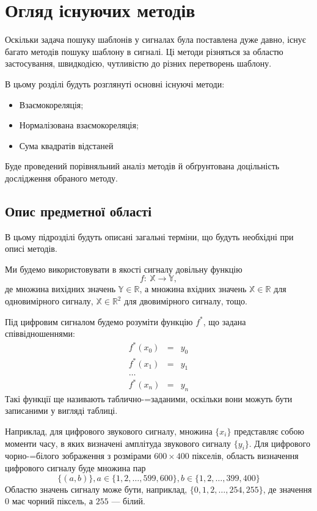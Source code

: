 \chapter{Огляд існуючих методів}

Оскільки задача пошуку шаблонів у сигналах була поставлена дуже давно, існує багато методів пошуку шаблону в сигналі.
Ці методи різняться за областю застосування, швидкодією, чутливістю до різних перетворень шаблону.

В цьому розділі будуть розглянуті основні існуючі методи:
\begin{itemize}
    \item Взаємокореляція;
    \item Нормалізована взаємокореляція;
    \item Сума квадратів відстаней
\end{itemize}

Буде проведений порівняльний аналіз методів й обґрунтована доцільність дослідження обраного методу.

\section{Опис предметної області}
    В цьому підрозділі будуть описані загальні терміни, що будуть необхідні при описі методів.

    Ми будемо використовувати в якості сигналу довільну функцію
    \[f:\:\mathbb{X} \rightarrow \mathbb{Y},\] де множина вихідних значень $\mathbb{Y} \in \mathbb{R}$, а множина
    вхідних значень $\mathbb{X} \in \mathbb{R}$ для одновимірного сигналу, $\mathbb{X} \in \mathbb{R}^2$ для двовимірного сигналу, тощо.

    Під цифровим сигналом будемо розуміти функцію $f^*$, що задана співвідношеннями:
    \begin{eqnarray*}
        f^*(x_0) &=& y_0\\
        f^*(x_1) &=& y_1\\
        \dots\\
        f^*(x_n) &=& y_n
    \end{eqnarray*}
    Такі функції ще називають таблично-=заданими, оскільки вони можуть бути записаними у вигляді таблиці.

    Наприклад, для цифрового звукового сигналу, множина $\{x_i\}$ представляє собою моменти часу, в яких визначені
    амплітуда звукового сигналу $\{y_i\}$.
    Для цифрового чорно-=білого зображення з розмірами $600 \times 400$ пікселів, область визначення цифрового сигналу
    буде множина пар
    \[\{ (a, b) \}, a \in \{1,2,\dots,599,600\}, b \in \{1,2,\dots,399,400\}\]
    Областю значень сигналу може бути, наприклад, $\{0,1,2,\dots,254,255\}$, де значення $0$ має чорний піксель, а
    $255$ --- білий.

